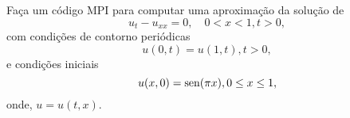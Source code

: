 \begin{exer}
  Faça um código MPI para computar uma aproximação da solução de
  \begin{equation}
    u_t - u_{xx} = 0,\quad 0<x<1, t>0,
  \end{equation}
  com condições de contorno periódicas
  \begin{equation}
    u(0,t) = u(1,t), t>0,
  \end{equation}
  e condições iniciais
  \begin{equation}
    u(x,0) = \operatorname{sen}(\pi x), 0\leq x\leq 1,
  \end{equation}
  onde, $u = u(t, x)$.  
\end{exer}



